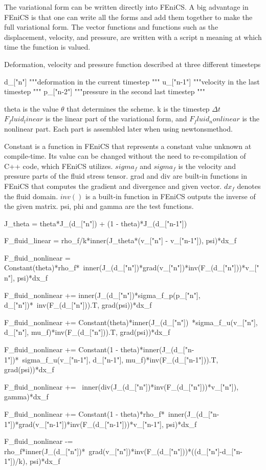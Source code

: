 The variational form can be written directly into FEniCS. A big advantage in FEniCS is that one can write all the forms and add them together to make the full variational form.
The vector functions and functions such as the displacement, velocity, and pressure, are written with a script n meaning at which time the function is valued. 
\begin{python}\caption{Deformation, velocity and pressure function described at three different timesteps }
d_["n"]  """deformation in the current timestep """
u_["n-1"] """velocity in the last timestep """
p_["n-2"] """pressure in the second last timestep """
\end{python}

theta is the value $\theta$ that determines the scheme.
k is the timestep $\Delta t$\\
$F_fluid_linear$ is the linear part of the variational form, and $F_fluid_nonlinear$ is the nonlinear part. Each part is assembled later when using newtonsmethod. 

Constant is a function in FEniCS that represents a constant value unknown at compile-time. Its value can be changed without the need to re-compilation of C++ code, which FEniCS utilizes.
$sigma_f$ and $sigma_f $ is the velocity and pressure parts of the fluid stress tensor.
grad and div are built-in functions in FEniCS that computes the gradient and divergence and given vector.
$dx_f$ denotes the fluid domain. 
$inv()$ is a built-in function in FEniCS outputs the inverse of the given matrix. 
psi, phi and gamma are the test functions.

\begin{python}
J_theta = theta*J_(d_["n"]) + (1 - theta)*J_(d_["n-1"]) 

F_fluid_linear = rho_f/k*inner(J_theta*(v_["n"] - v_["n-1"]), psi)*dx_f

F_fluid_nonlinear =  Constant(theta)*rho_f*\
inner(J_(d_["n"])*grad(v_["n"])*inv(F_(d_["n"]))*v_["n"], psi)*dx_f

F_fluid_nonlinear += inner(J_(d_["n"])*sigma_f_p(p_["n"], d_["n"])*\
inv(F_(d_["n"])).T, grad(psi))*dx_f

F_fluid_nonlinear += Constant(theta)*inner(J_(d_["n"])\
*sigma_f_u(v_["n"], d_["n"], mu_f)*inv(F_(d_["n"])).T, grad(psi))*dx_f

F_fluid_nonlinear += Constant(1 - theta)*inner(J_(d_["n-1"])*\
sigma_f_u(v_["n-1"], d_["n-1"], mu_f)*inv(F_(d_["n-1"])).T, grad(psi))*dx_f

F_fluid_nonlinear += \
inner(div(J_(d_["n"])*inv(F_(d_["n"]))*v_["n"]), gamma)*dx_f

F_fluid_nonlinear += Constant(1 - theta)*rho_f*\
inner(J_(d_["n-1"])*grad(v_["n-1"])*inv(F_(d_["n-1"]))*v_["n-1"], psi)*dx_f

F_fluid_nonlinear -= rho_f*inner(J_(d_["n"])*\
grad(v_["n"])*inv(F_(d_["n"]))*((d_["n"]-d_["n-1"])/k), psi)*dx_f
\end{python}

